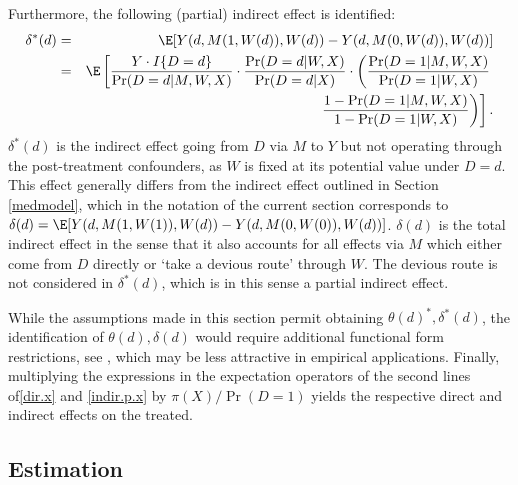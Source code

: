 \documentclass[nojss]{jss}
\begin{document}
Furthermore, the following (partial) indirect effect is identified:
\begin{eqnarray}\label{indir.p.x}
\delta^*(d) &=& \E[Y(d,M(1,W(d)),W(d))-Y(d,M(0,W(d)),W(d))] \notag \\
&=& \E \left[ \frac{Y\cdot I\{D=d\}}{\Pr (D=d|M,W,X)}\cdot \frac{\Pr(D=d|W,X)}{\Pr(D=d|X)} \cdot \left(\frac{\Pr(D=1|M,W,X)}{\Pr(D=1|W,X)} \right.\right. \\
                                                                                                                          && \left.\left. \frac{1-\Pr(D=1|M,W,X)}{1-\Pr(D=1|W,X)}\right) \right].\notag
\end{eqnarray}
$\delta^*(d)$ is the indirect effect going from $D$ via $M$ to $Y$ but not operating through the post-treatment confounders, as $W$ is fixed at its potential value under $D=d$. This effect generally differs from the indirect effect outlined in Section \ref{medmodel}, which in the notation of the current section corresponds to  $\delta(d) = \E[Y(d,M(1,W(1)),W(d))-Y(d,M(0,W(0)),W(d))]$. $\delta(d)$ is the total indirect effect in the sense that it also accounts for all effects via $M$ which either come from $D$ directly or `take a devious route' through $W$. The devious route is not considered in $\delta^*(d)$, which is in this sense a partial indirect effect.

While the assumptions made in this section permit obtaining $\theta(d)^*, \delta^*(d)$, the identification of $\theta(d), \delta(d)$ would require additional functional form restrictions, see \cite{AvinShpitserPearl2005}, which may be less attractive in empirical applications. Finally, multiplying the expressions in the expectation operators of the second lines of\eqref{dir.x} and \eqref{indir.p.x} by $\pi(X)/\Pr(D=1)$ yields the respective direct and indirect effects on the treated.

\subsection{Estimation}\label{est1}
\end{document}
